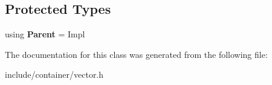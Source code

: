 \subsection*{Protected Types}
\begin{DoxyCompactItemize}
\item 
\mbox{\label{classbzd_1_1impl_1_1Vector_af04f9b0096d49ebab090f1b12a6f2172}} 
using {\bfseries Parent} = Impl
\end{DoxyCompactItemize}


The documentation for this class was generated from the following file\+:\begin{DoxyCompactItemize}
\item 
include/container/vector.\+h\end{DoxyCompactItemize}
